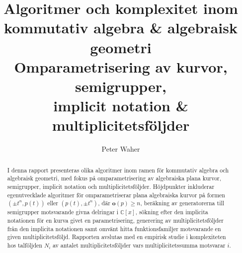 \documentclass[twoside]{article}
\title{Algoritmer och komplexitet inom \\
	kommutativ algebra \& algebraisk geometri \\[20pt]
	\large Omparametrisering av kurvor, semigrupper, \\
	implicit notation \& multiplicitetsföljder}
\author{Peter Waher}
\begin{document}
\maketitle

\begin{abstract}
I denna rapport presenteras olika algoritmer inom ramen för kommutativ algebra och algebraisk geometri, med fokus på omparametrisering av algebraiska plana kurvor, semigrupper, implicit notation och multiplicitetsföljder. Höjdpunkter inkluderar egenutvecklade algoritmer för omparametriserar plana algebraiska kurvor på formen $(\pm t^n, p(t))$ eller $(p(t), \pm t^n)$, där $\mathbf{o}(p)\geq n$, beräkning av generatorerna till semigrupper motsvarande givna delringar i $\mathbb{C}[x]$, sökning efter den implicita notationen för en kurva givet en parametrisering, generering av multiplicitetsföljder från den implicita notationen samt omvänt hitta funktionsfamiljer motsvarande en given multiplicitetsföljd. Rapporten avslutas med en empirisk studie i komplexiteten hos talföljden $N_i$ av antalet multiplicitetsföljder vars multiplicitetssumma motsvarar $i$. 
\end{abstract}
\end{document}
